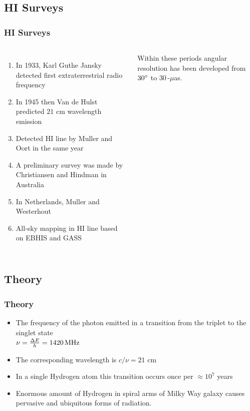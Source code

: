 \documentclass{beamer}
\begin{document}

\subsection{HI Surveys}

\begin{frame}
\frametitle{HI Surveys}
\begin{columns}[c] %

\begin{enumerate}
\item In 1933, Karl Guthe Jansky detected first extraterrestrial radio frequency
\item In 1945 then Van de Hulst predicted $21$ cm wavelength emission
\item Detected HI line by Muller and Oort in the same year
\item A preliminary survey was made by Christiansen and Hindman in Australia
\item In Netherlands, Muller and Westerhout
\item All-sky mapping in HI line based on EBHIS and GASS
\end{enumerate}

Within these periods angular resolution has been developed from $30\degree$ to $30$\,-$\mu$as\cite{kellermann2001development,Middelberg2008}.

\end{columns}
\end{frame}


\subsection{Theory}


\begin{frame}
\frametitle{Theory}
\begin{theorem}
\begin{itemize}
\item The frequency of the photon emitted in a transition from the triplet to the singlet state\cite{griffiths2016introduction}\\
$\mathit{\nu}=\frac{\Delta\-E}{h}=\SI{1420}{MHz}$
\item The corresponding wavelength is $c/\nu=21$ cm
\item In a single Hydrogen atom this transition occurs once per $\approx10^{7}$ years 
\item Enormous amount of Hydrogen in spiral arms of Milky Way galaxy causes pervasive and ubiquitous forms of radiation.
\end{itemize}
\end{theorem}
\end{frame}
\end{document}
